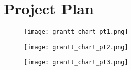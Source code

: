 \newpage

\section*{Project Plan}

\begin{figure}[H]
    \texttt{[image: grantt\_chart\_pt1.png]}
\end{figure}

\begin{figure}[H]
    \texttt{[image: grantt\_chart\_pt2.png]}
\end{figure}

\begin{figure}[H]
    \texttt{[image: grantt\_chart\_pt3.png]}
\end{figure}